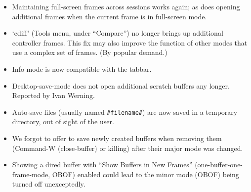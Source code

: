 \begin{itemize}
\item Maintaining full-screen frames across sessions works again; as does opening additional frames when the current frame is in full-screen mode.


\item `ediff' (Tools menu, under ``Compare'') no longer brings up additional controller frames.  This fix may also improve the function of other modes that use a complex set of frames. (By popular demand.)

\item Info-mode is now compatible with the tabbar.

\item Desktop-save-mode does not open additional scratch buffers any longer.
Reported by Ivan Werning.

\item Auto-save files (usually named {\tt \#filename\#}) are now saved in a temporary directory, out of sight of the user.

\item We forgot to offer to save newly created buffers when removing them (Command-W (close-buffer) or killing) after their major mode was changed.

\item Showing a dired buffer with ``Show Buffers in New Frames'' (one-buffer-one-frame-mode, OBOF) enabled could lead to  the minor mode (OBOF) being turned off unexceptedly. 

\end{itemize}


